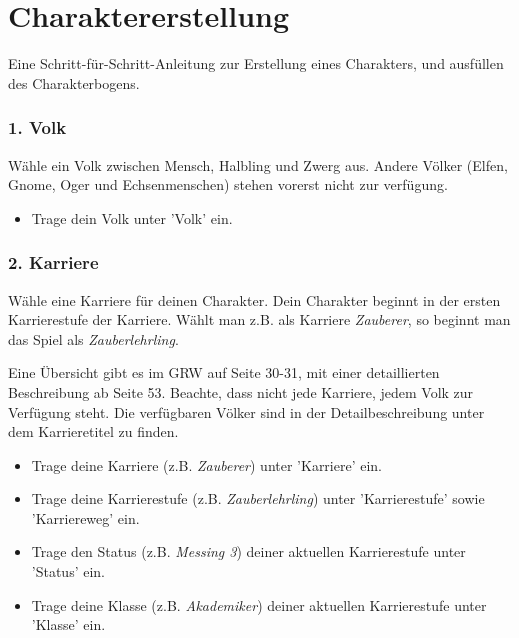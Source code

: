\documentclass[a4paper,10pt,twoside,twocolumn,openany,nodeprecatedcode,bg=print]{dndbook}
\begin{document}
\chapter{Charaktererstellung}
Eine Schritt-für-Schritt-Anleitung zur Erstellung eines Charakters, und ausfüllen des Charakterbogens.

\subsection{1. Volk}
Wähle ein Volk zwischen Mensch, Halbling und Zwerg aus.
Andere Völker (Elfen, Gnome, Oger und Echsenmenschen) stehen vorerst nicht zur verfügung.

\begin{DndReadAloud}
  \begin{itemize}[noitemsep]
    \item Trage dein Volk unter 'Volk' ein.
  \end{itemize}
\end{DndReadAloud}

\subsection{2. Karriere}
Wähle eine Karriere für deinen Charakter.
Dein Charakter beginnt in der ersten Karrierestufe der Karriere. Wählt man z.B. als Karriere \textit{Zauberer}, so beginnt man das Spiel als \textit{Zauberlehrling}.

Eine Übersicht gibt es im GRW auf Seite 30-31, mit einer detaillierten Beschreibung ab Seite 53.
Beachte, dass nicht jede Karriere, jedem Volk zur Verfügung steht. Die verfügbaren Völker sind in der Detailbeschreibung unter dem Karrieretitel zu finden.

\begin{DndReadAloud}
  \begin{itemize}[noitemsep]
    \item Trage deine Karriere (z.B. \textit{Zauberer}) unter 'Karriere' ein.
    \item Trage deine Karrierestufe (z.B. \textit{Zauberlehrling}) unter 'Karrierestufe' sowie 'Karriereweg' ein.
    \item Trage den Status (z.B. \textit{Messing 3}) deiner aktuellen Karrierestufe unter 'Status' ein.
    \item Trage deine Klasse (z.B. \textit{Akademiker}) deiner aktuellen Karrierestufe unter 'Klasse' ein.
  \end{itemize}
\end{DndReadAloud}
\end{document}
